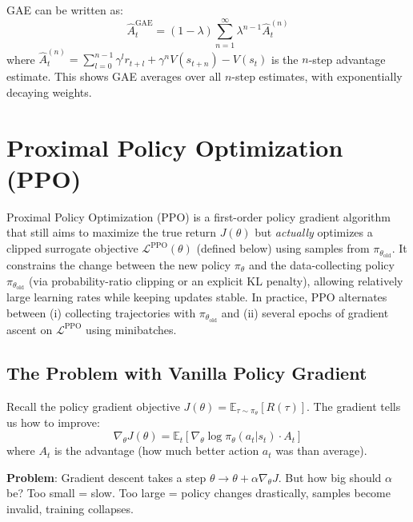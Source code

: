 \begin{proposition}
    GAE can be written as:
    \[
        \hat{A}_t^{\text{GAE}} = (1-\lambda) \sum_{n=1}^{\infty} \lambda^{n-1} \hat{A}_t^{(n)}
    \]
    where $\hat{A}_t^{(n)} = \sum_{l=0}^{n-1} \gamma^l r_{t+l} + \gamma^n V(s_{t+n}) - V(s_t)$ is the $n$-step advantage estimate. This shows GAE averages over all $n$-step estimates, with exponentially decaying weights.
\end{proposition}

\section{Proximal Policy Optimization (PPO)}

\begin{definition}
    Proximal Policy Optimization (PPO) is a first-order policy gradient algorithm that still aims to maximize the true return $J(\theta)$ but \emph{actually} optimizes a clipped surrogate objective $\mathcal{L}^{\text{PPO}}(\theta)$ (defined below) using samples from $\pi_{\theta_{\text{old}}}$.
    It constrains the change between the new policy $\pi_\theta$ and the data-collecting policy $\pi_{\theta_{\text{old}}}$ (via probability-ratio clipping or an explicit KL penalty), allowing relatively large learning rates while keeping updates stable.
    In practice, PPO alternates between (i) collecting trajectories with $\pi_{\theta_{\text{old}}}$ and (ii) several epochs of gradient ascent on $\mathcal{L}^{\text{PPO}}$ using minibatches.
\end{definition}

\subsection{The Problem with Vanilla Policy Gradient}

Recall the policy gradient objective $J(\theta) = \mathbb{E}_{\tau \sim \pi_\theta}[R(\tau)]$. The gradient tells us how to improve:
\[
    \nabla_\theta J(\theta) = \mathbb{E}_t \left[ \nabla_\theta \log \pi_\theta(a_t|s_t) \cdot A_t \right]
\]
where $A_t$ is the advantage (how much better action $a_t$ was than average).

\textbf{Problem}: Gradient descent takes a step $\theta \to \theta + \alpha \nabla_\theta J$. But how big should $\alpha$ be? Too small = slow. Too large = policy changes drastically, samples become invalid, training collapses.

